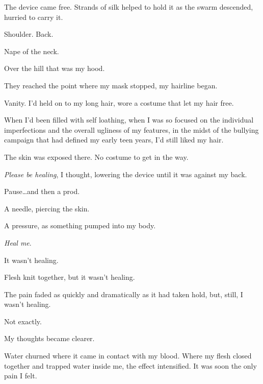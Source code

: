 The device came free.  Strands of silk helped to hold it as the swarm descended, hurried to carry it.



Shoulder.  Back.



Nape of the neck.



Over the hill that was my hood.



They reached the point where my mask stopped, my hairline began.



Vanity.  I'd held on to my long hair, wore a costume that let my hair free.



When I'd been filled with self loathing, when I was so focused on the individual imperfections and the overall ugliness of my features, in the midst of the bullying campaign that had defined my early teen years, I'd still liked my hair.



The skin was exposed there.  No costume to get in the way.



\emph{Please be healing}, I thought, lowering the device until it was against my back.



Pause\ldots and then a prod.



A needle, piercing the skin.



A pressure, as something pumped into my body.



\emph{Heal me}.



It wasn't healing.



Flesh knit together, but it wasn't healing.



The pain faded as quickly and dramatically as it had taken hold, but, still, I wasn't healing.



Not exactly.



My thoughts became clearer.



Water churned where it came in contact with my blood.  Where my flesh closed together and trapped water inside me, the effect intensified.  It was soon the only pain I felt.



